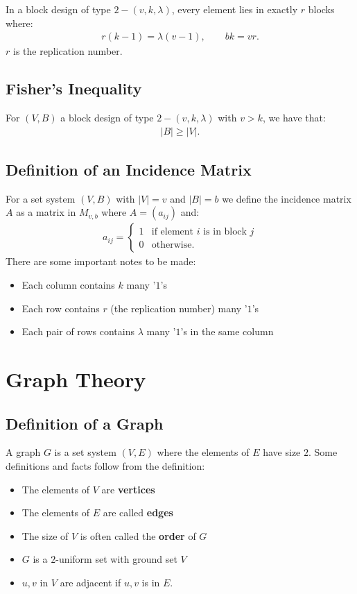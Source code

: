 \documentclass[a4paper, 12pt, twoside]{article}
\begin{document}
In a block design of type $2-(v,k,\lambda)$, every element lies in
exactly $r$ blocks where: \begin{gather*}
  r(k - 1) = \lambda(v - 1), \qquad bk = vr.
\end{gather*} $r$ is the replication number.

\subsection{Fisher's Inequality}

For $(V, B)$ a block design of type $2 - (v, k, \lambda)$ with $v > k$,
we have that: \begin{gather*}
  |B| \geq |V|.
\end{gather*}

\subsection{Definition of an Incidence Matrix}

For a set system $(V, B)$ with $|V| = v$ and $|B| = b$ we define the
incidence matrix $A$ as a matrix in $M_{v, b}$ where $A = (a_{ij})$ 
and: \begin{gather*}
  a_{ij} = \begin{cases}
    1 & \text{if element } i \text{ is in block } j \\
    0 & \text{otherwise}.
  \end{cases}
\end{gather*} There are some important notes to be made: \begin{itemize}
  \item Each column contains $k$ many '$1$'s
  \item Each row contains $r$ (the replication number) many '$1$'s
  \item Each pair of rows contains $\lambda$ many '$1$'s in the same
  column
\end{itemize}

\section{Graph Theory}

\subsection{Definition of a Graph}

A graph $G$ is a set system $(V, E)$ where the elements of $E$ have
size $2$. Some definitions and facts follow from the definition:
\begin{itemize}
  \item The elements of $V$ are \textbf{vertices}
  \item The elements of $E$ are called \textbf{edges}
  \item The size of $V$ is often called the \textbf{order} of $G$
  \item $G$ is a $2$-uniform set with ground set $V$
  \item $u, v$ in $V$ are adjacent if ${u, v}$ is in $E$.
\end{itemize}  
\end{document}
